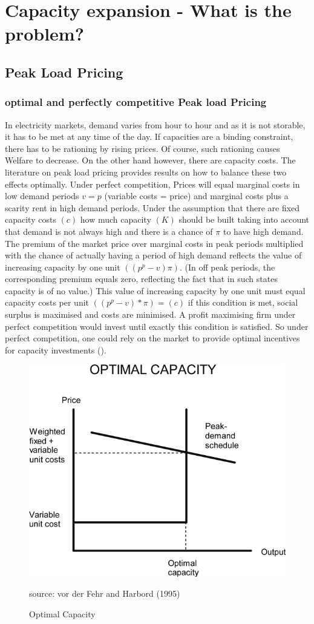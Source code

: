 \section{Capacity expansion - What is the problem?}

\subsection{Peak Load Pricing}

\subsubsection{optimal and perfectly competitive Peak load Pricing}

In electricity markets, demand varies from hour to hour and as it is not storable, it has to be met at any time of the day. If capacities are a binding constraint, there has to be rationing by rising prices. Of course, such rationing causes Welfare to decrease. On the other hand however, there are capacity costs. The literature on peak load pricing provides results on how to balance these two effects optimally. Under perfect competition, Prices will equal marginal costs in low demand periods $v=p$ (variable costs = price) and marginal costs plus a scarity rent in high demand periods. Under the assumption that there are fixed capacity costs $(c)$ how much capacity $(K)$ should be built taking into account that demand is not always high and there is a chance of $\pi$ to have high demand. The premium of the market price over marginal costs in peak periods multiplied with the chance of actually having a period of high demand reflects the value of increasing capacity by one unit $((p^p-v)\pi)$. (In off peak periods, the corresponding premium equals zero, reflecting the fact that in such states capacity is of no value.) This value of increasing capacity by one unit must equal capacity costs per unit $((p^p-v)*\pi)=(c)$ if this condition is met, social surplus is maximised and costs are minimised. A profit maximising firm under perfect competition would invest until exactly this condition is satisfied. So under perfect competition, one could rely on the market to provide optimal incentives for capacity investments (\cite{Fehr1995}).

\begin{figure}[h]
\centering
\includegraphics[width=.5\textwidth]{capacity/peak_load_opt}
      \label{peak_load_opt}
      \caption{Optimal Capacity}
      source: vor der Fehr and Harbord (1995)     
\end{figure}

